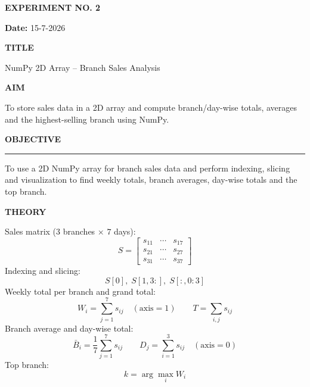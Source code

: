 \documentclass[11pt,twoside]{article}
\newcommand{\expheading}[1]{{\fontsize{14}{17}\selectfont\textbf{#1}\par}}
\newcommand{\fullrule}{\noindent\rule{\textwidth}{0.6pt}\par}
\newcommand{\tooddpage}{\clearpage\ifodd\value{page}\else\null\thispagestyle{empty}\newpage\fi}
\begin{document}
\tooddpage

{\setlength{\parskip}{1pt}\setlength{\abovedisplayskip}{2pt}\setlength{\belowdisplayskip}{2pt}
\begin{center}
\expheading{EXPERIMENT NO. 2}
\end{center}
\vspace{2pt}

\noindent\textbf{Date:} 15-7-2026\par
\vspace{6pt}

\expheading{TITLE}
\vspace{4pt}
\noindent NumPy 2D Array -- Branch Sales Analysis\par
\vspace{4pt}

\expheading{AIM}
\vspace{4pt}
\noindent To store sales data in a 2D array and compute branch/day-wise totals, averages and the highest-selling branch using NumPy. \par
\vspace{4pt}

\expheading{OBJECTIVE}
\vspace{2pt}
\fullrule
\vspace{4pt}
\noindent To use a 2D NumPy array for branch sales data and perform indexing, slicing and visualization to find weekly totals, branch averages, day-wise totals and the top branch. \par
\vspace{4pt}

\expheading{THEORY}
\vspace{4pt}
Sales matrix ($3$ branches $\times$ $7$ days):
\[S=\begin{bmatrix}s_{11} & \cdots & s_{17}\\s_{21} & \cdots & s_{27}\\s_{31} & \cdots & s_{37}\end{bmatrix}\]
Indexing and slicing:
\[S[0],\; S[1,3:],\; S[:,0:3]\]
Weekly total per branch and grand total:
\[W_i=\sum_{j=1}^{7}s_{ij}\quad(\text{axis}=1)\qquad T=\sum_{i,j}s_{ij}\]
Branch average and day-wise total:
\[\bar{B}_i=\frac{1}{7}\sum_{j=1}^{7}s_{ij}\qquad D_j=\sum_{i=1}^{3}s_{ij}\quad(\text{axis}=0)\]
Top branch:
\[k=\arg\max_i W_i\]
\vspace{4pt}

}
\end{document}
